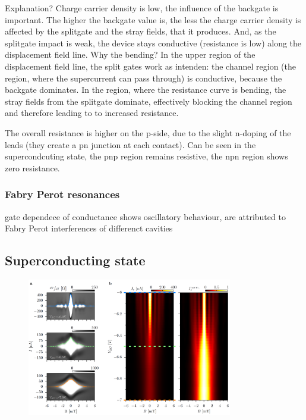Explanation? Charge carrier density is low, the influence of the backgate is important. The higher the backgate value is, the less the charge carrier density is affected by the splitgate and the stray fields, that it produces. And, as the splitgate impact is weak, the device stays conductive (resistance is low) along the displacement field line. 
Why the bending? In the upper region of the displacement field line, the split gates work as intenden: the channel region (the region, where the supercurrent can pass through) is conductive, because the backgate dominates. In the region, where the resistance curve is bending, the stray fields from the splitgate dominate, effectively blocking the channel region and therefore leading to to increased resistance.

The overall resistance is higher on the p-side, due to the slight n-doping of the leads (they create a pn junction at each contact). Can be seen in the supercondcuting state, the pnp region remains resistive, the npn region shows zero resistance.

\subsubsection*{Fabry Perot resonances}

gate dependece of conductance shows oscillatory behaviour, are attributed to Fabry Perot interferences of differenct cavities \cite{Shytov2008}


\subsection*{Superconducting state}
\begin{figure}
\centering
\includegraphics[width=0.8\textwidth]{figure/experiment/supercurrent}
\end{figure}

